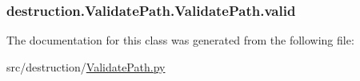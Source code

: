 \hypertarget{classdestruction_1_1_validate_path_1_1_validate_path_a5cff4e3f7df6bc2cec558baaaf95f3d1}{
\subsubsection[{valid}]{\setlength{\rightskip}{0pt plus 5cm}destruction.\-Validate\-Path.\-Validate\-Path.\-valid}}\label{classdestruction_1_1_validate_path_1_1_validate_path_a5cff4e3f7df6bc2cec558baaaf95f3d1}


The documentation for this class was generated from the following file\-:\begin{DoxyCompactItemize}
\item 
src/destruction/\hyperlink{_validate_path_8py}{Validate\-Path.\-py}\end{DoxyCompactItemize}
